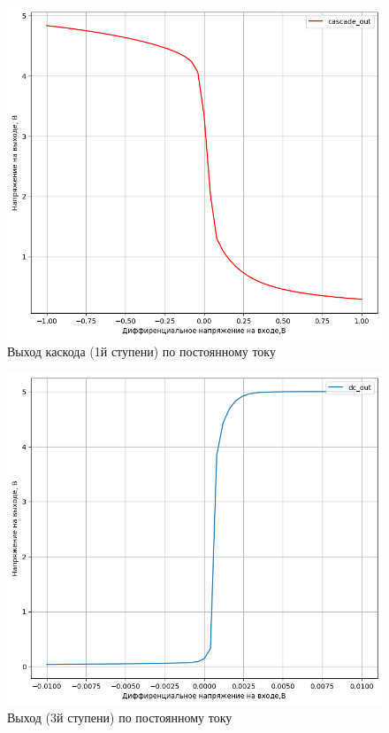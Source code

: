 \documentclass[a4paper,12pt]{article} %
\begin{document}
\begin{figure}[H]
    \includegraphics[width=\textwidth]{opamp/opamp_cascade_out.png}
    \caption{Выход каскода (1й ступени) по постоянному току}
    \label{pic:opamp_dc_casc}
\end{figure}

\begin{figure}[H]
    \includegraphics[width=\textwidth]{opamp/opamp_dc_out.png}
    \caption{Выход (3й ступени) по постоянному току}
    \label{pic:opamp_dc_out}
\end{figure}
\end{document}
